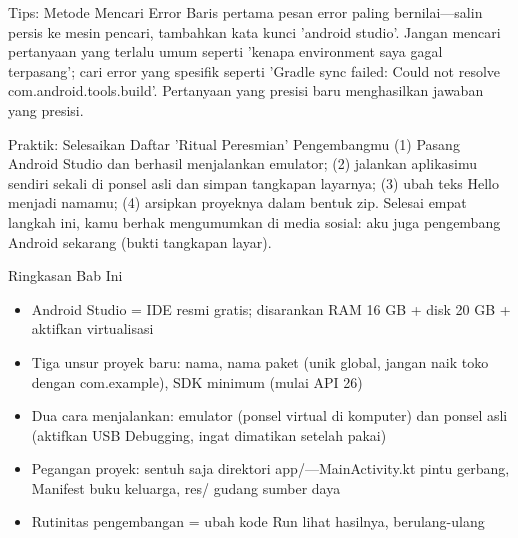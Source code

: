\begin{tcbinfo}{Tips: Metode Mencari Error}
Baris pertama pesan error paling bernilai—salin persis ke mesin pencari, tambahkan kata kunci 'android studio'. Jangan mencari pertanyaan yang terlalu umum seperti 'kenapa environment saya gagal terpasang'; cari error yang spesifik seperti 'Gradle sync failed: Could not resolve com.android.tools.build'. Pertanyaan yang presisi baru menghasilkan jawaban yang presisi.

\end{tcbinfo}

\begin{tcbpractice}{Praktik: Selesaikan Daftar 'Ritual Peresmian' Pengembangmu}
(1) Pasang Android Studio dan berhasil menjalankan emulator; (2) jalankan aplikasimu sendiri sekali di ponsel asli dan simpan tangkapan layarnya; (3) ubah teks Hello menjadi namamu; (4) arsipkan proyeknya dalam bentuk zip. Selesai empat langkah ini, kamu berhak mengumumkan di media sosial: aku juga pengembang Android sekarang (bukti tangkapan layar).

\end{tcbpractice}

\begin{tcbsummary}{Ringkasan Bab Ini}
\begin{itemize}
  \item Android Studio = IDE resmi gratis; disarankan RAM 16 GB + disk 20 GB + aktifkan virtualisasi
  \item Tiga unsur proyek baru: nama, nama paket (unik global, jangan naik toko dengan com.example), SDK minimum (mulai API 26)
  \item Dua cara menjalankan: emulator (ponsel virtual di komputer) dan ponsel asli (aktifkan USB Debugging, ingat dimatikan setelah pakai)
  \item Pegangan proyek: sentuh saja direktori app/—MainActivity.kt pintu gerbang, Manifest buku keluarga, res/ gudang sumber daya
  \item Rutinitas pengembangan = ubah kode Run lihat hasilnya, berulang-ulang
\end{itemize}

\end{tcbsummary}
